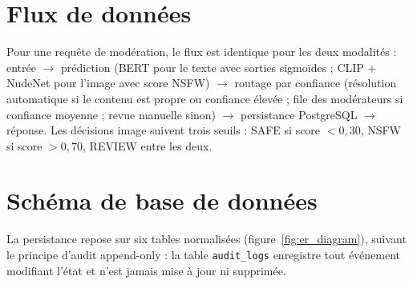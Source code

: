 \section{Flux de données}

Pour une requête de modération, le flux est identique pour les deux modalités : entrée $\to$ prédiction (BERT pour le texte avec sorties sigmoïdes ; CLIP + NudeNet pour l'image avec score NSFW) $\to$ routage par confiance (résolution automatique si le contenu est propre ou confiance élevée ; file des modérateurs si confiance moyenne ; revue manuelle sinon) $\to$ persistance PostgreSQL $\to$ réponse. Les décisions image suivent trois seuils : SAFE si score $< 0{,}30$, NSFW si score $> 0{,}70$, REVIEW entre les deux.

\section{Schéma de base de données}

La persistance repose sur six tables normalisées (figure~\ref{fig:er_diagram}), suivant le principe d'audit append-only : la table \texttt{audit\_logs} enregistre tout événement modifiant l'état et n'est jamais mise à jour ni supprimée.

